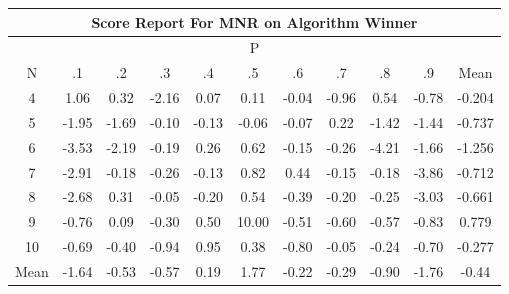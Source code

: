 \documentclass[11pt,a4paper]{report}
\begin{document}
\begin{longtable}{ | c || c | c | c | c | c | c | c | c | c || c |}
\hline
\multicolumn{11}{|c|}{ Score Report For MNR on Algorithm Winner} \\
\hline
\multicolumn{11}{|c|}{ P } \\
\hline
N & .1 & .2 & .3 & .4 & .5 & .6 & .7 & .8 & .9 & Mean\\
 \hline
 \hline
 \endhead
  4 &  \cellcolor[HTML]{E7E7FF} 1.06 &  \cellcolor[HTML]{F7F7FF} 0.32 &  \cellcolor[HTML]{FFC7C7} -2.16 &  \cellcolor[HTML]{FFFFFF} 0.07 &  \cellcolor[HTML]{FFFFFF} 0.11 &  \cellcolor[HTML]{FFFFFF} -0.04 &  \cellcolor[HTML]{FFE7E7} -0.96 &  \cellcolor[HTML]{EFEFFF} 0.54 &  \cellcolor[HTML]{FFEFEF} -0.78 & -0.204 \\
  5 &  \cellcolor[HTML]{FFCFCF} -1.95 &  \cellcolor[HTML]{FFD7D7} -1.69 &  \cellcolor[HTML]{FFFFFF} -0.10 &  \cellcolor[HTML]{FFFFFF} -0.13 &  \cellcolor[HTML]{FFFFFF} -0.06 &  \cellcolor[HTML]{FFFFFF} -0.07 &  \cellcolor[HTML]{F7F7FF} 0.22 &  \cellcolor[HTML]{FFDFDF} -1.42 &  \cellcolor[HTML]{FFD7D7} -1.44 & -0.737 \\
  6 &  \cellcolor[HTML]{FFA7A7} -3.53 &  \cellcolor[HTML]{FFC7C7} -2.19 &  \cellcolor[HTML]{FFF7F7} -0.19 &  \cellcolor[HTML]{F7F7FF} 0.26 &  \cellcolor[HTML]{EFEFFF} 0.62 &  \cellcolor[HTML]{FFFFFF} -0.15 &  \cellcolor[HTML]{FFF7F7} -0.26 &  \cellcolor[HTML]{FF9797} -4.21 &  \cellcolor[HTML]{FFD7D7} -1.66 & -1.256 \\
  7 &  \cellcolor[HTML]{FFB7B7} -2.91 &  \cellcolor[HTML]{FFF7F7} -0.18 &  \cellcolor[HTML]{FFF7F7} -0.26 &  \cellcolor[HTML]{FFFFFF} -0.13 &  \cellcolor[HTML]{E7E7FF} 0.82 &  \cellcolor[HTML]{F7F7FF} 0.44 &  \cellcolor[HTML]{FFFFFF} -0.15 &  \cellcolor[HTML]{FFF7F7} -0.18 &  \cellcolor[HTML]{FF9F9F} -3.86 & -0.712 \\
  8 &  \cellcolor[HTML]{FFBFBF} -2.68 &  \cellcolor[HTML]{F7F7FF} 0.31 &  \cellcolor[HTML]{FFFFFF} -0.05 &  \cellcolor[HTML]{FFF7F7} -0.20 &  \cellcolor[HTML]{EFEFFF} 0.54 &  \cellcolor[HTML]{FFF7F7} -0.39 &  \cellcolor[HTML]{FFF7F7} -0.20 &  \cellcolor[HTML]{FFF7F7} -0.25 &  \cellcolor[HTML]{FFAFAF} -3.03 & -0.661 \\
  9 &  \cellcolor[HTML]{FFEFEF} -0.76 &  \cellcolor[HTML]{FFFFFF} 0.09 &  \cellcolor[HTML]{FFF7F7} -0.30 &  \cellcolor[HTML]{EFEFFF} 0.50 &  \cellcolor[HTML]{0808FF} 10.00 &  \cellcolor[HTML]{FFEFEF} -0.51 &  \cellcolor[HTML]{FFEFEF} -0.60 &  \cellcolor[HTML]{FFEFEF} -0.57 &  \cellcolor[HTML]{FFE7E7} -0.83 & 0.779 \\
  10 &  \cellcolor[HTML]{FFEFEF} -0.69 &  \cellcolor[HTML]{FFF7F7} -0.40 &  \cellcolor[HTML]{FFE7E7} -0.94 &  \cellcolor[HTML]{E7E7FF} 0.95 &  \cellcolor[HTML]{F7F7FF} 0.38 &  \cellcolor[HTML]{FFE7E7} -0.80 &  \cellcolor[HTML]{FFFFFF} -0.05 &  \cellcolor[HTML]{FFF7F7} -0.24 &  \cellcolor[HTML]{FFEFEF} -0.70 & -0.277 \\
 \hline
 \hline
Mean &  \cellcolor[HTML]{FFD7D7} -1.64 &  \cellcolor[HTML]{FFEFEF} -0.53 &  \cellcolor[HTML]{FFEFEF} -0.57 &  \cellcolor[HTML]{F7F7FF} 0.19 &  \cellcolor[HTML]{CFCFFF} 1.77 &  \cellcolor[HTML]{FFF7F7} -0.22 &  \cellcolor[HTML]{FFF7F7} -0.29 &  \cellcolor[HTML]{FFE7E7} -0.90 &  \cellcolor[HTML]{FFCFCF} -1.76 &  \cellcolor[HTML]{FFF7F7} -0.44
\end{longtable}
\end{document}
